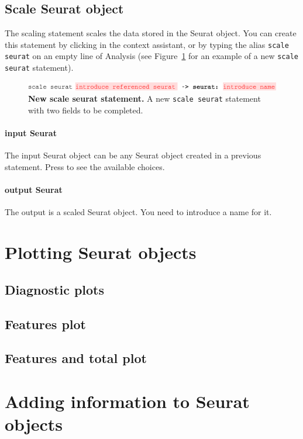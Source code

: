 \subsection{Scale Seurat object}
The scaling statement scales the data stored in the Seurat object.
You can create this statement by clicking  in the context assistant,
or by typing the alias \texttt{scale seurat} on an empty line of Analysis (see Figure~\ref{fig:ScaleSeurat}
for an example of a new \texttt{scale seurat} statement).

\begin{figure}[h!tbp]
  \centering
  \includegraphics[width=\figWidthWide]{figures/ScaleSeurat.pdf}
    \caption[New scale seurat statement.]{\textbf{New scale seurat statement.}
    A new \texttt{scale seurat} statement with two fields to be completed.}
\label{fig:ScaleSeurat}
\end{figure}

\paragraph{input Seurat}
The input Seurat object can be any Seurat object created in a previous statement. Press
\keys{\ctrl+\space} to see the available choices.

\paragraph{output Seurat}
The output is a scaled Seurat object. You need to introduce a name for it.

\section{Plotting Seurat objects}
\subsection{Diagnostic plots}\label{subsec:DiagnosticPlots}
\subsection{Features plot}
\subsection{Features and total plot}

\section{Adding information to Seurat objects}
